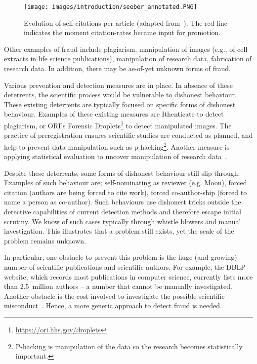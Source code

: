 \documentclass{ou-report}
\newcommand{\HJ}[1]{{\color{red} HJ: #1}}
\begin{document}
\begin{figure}[H]
\centering
\texttt{[image: images/introduction/seeber\_annotated.PNG]}
\caption{Evolution of self-citations per article (adapted from~\cite{SEEBER2019478}).
    The red line indicates the moment citation-rates became input for promotion.}
\label{fig:seeber}
\end{figure}

Other examples of fraud include plagiarism, manipulation  of images
(e.g., of cell extracts in life science publications), manipulation of research
data, fabrication of research data. In addition, there may be as-of-yet unknown
forms of fraud.

Various prevention and detection measures are in place. In absence of these 
deterrents, the scientific process would be vulnerable to dishonest behaviour. 
These existing deterrents are typically focused on specific forms of dishonest 
behaviour. Examples of these existing measures are Ithenticate to detect 
plagiarism, or ORI's Forensic
Droplets\footnote{\url{https://ori.hhs.gov/droplets}} 
to detect manipulated images. The practice of preregistration ensures scientific
studies are conducted as planned, and help to prevent data manipulation such as 
p-hacking\footnote{P-hacking is manipulation of the data so the research becomes
statistically important.}. Another measure is applying statistical evaluation to
uncover manipulation of research data~\cite{HGWA2019}. 

Despite these deterrents, some forms of dishonest behaviour still slip through.
Examples of such behaviour are;
self-nominating as reviewer (e.g. Moon), forced citation (authors are being forced
to cite work), forced co-author-ship (forced to name a person as co-author).
Such behaviours use dishonest tricks outside the detective capabilities of
current detection methods and therefore escape initial scrutiny. We know of
such cases typically through whistle blowers and manual investigation. 
This illustrates that a problem still exists, yet the scale of the
problem remains unknown.

In particular, one obstacle to prevent this problem is the huge (and growing) 
number of scientific 
publications and scientific authors. For example, the DBLP website, which 
records most publications in computer science, currently lists more than 
2.5~million authors -- a number that cannot be manually investigated. 
Another obstacle is the cost involved to investigate the possible scientific 
misconduct~\cite{MHWT2010}.
Hence, a more generic approach to detect fraud is needed. 
\end{document}
